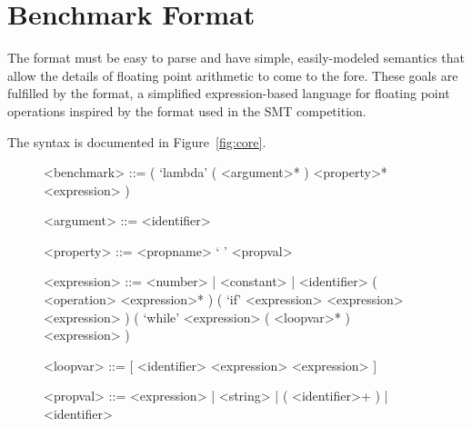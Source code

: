 \documentclass[main.tex]{subfiles}
\begin{document}
\section{Benchmark Format}
\label{sec:format}

The \name format must be easy to parse and have simple, easily-modeled
semantics that allow the details of floating point arithmetic to come
to the fore. These goals are fulfilled by the \core format, a
simplified expression-based language for floating point operations
inspired by the \smtlib format used in the SMT competition.

The \core syntax is documented in Figure~\ref{fig:core}.

\begin{figure}
\begin{grammar}
<benchmark> ::= ( `lambda' ( <argument>* ) <property>* <expression> )

<argument> ::= <identifier>

<property> ::= <propname> ` ' <propval>

<expression> ::= <number> | <constant> | <identifier>
\alt ( <operation> <expression>* )
\alt ( `if' <expression> <expression> <expression> )
\alt ( `while' <expression> ( <loopvar>* ) <expression> )

<loopvar> ::= [ <identifier> <expression> <expression> ]

<propval> ::= <expression> | <string> | ( <identifier>+ ) | <identifier>

\end{grammar}

\end{figure}
\end{document}
